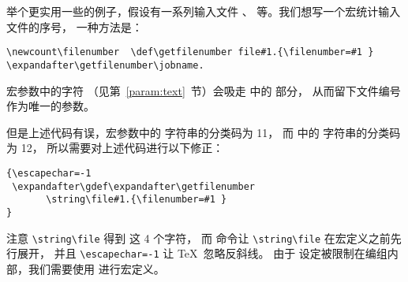 \documentclass{book}
\begin{document}
举个更实用一些的例子，假设有一系列输入文件 、
\label{ex:jobnumber}等。我们想写一个宏统计输入文件的序号，
一种方法是：
\begin{verbatim}
\newcount\filenumber  \def\getfilenumber file#1.{\filenumber=#1 }
\expandafter\getfilenumber\jobname.
\end{verbatim}
宏参数中的字符 （见第~\ref{param:text}~节）会吸走
 中的  部分，
从而留下文件编号作为唯一的参数。

但是上述代码有误，宏参数中的  字符串的分类码为 11，
而  中的  字符串的分类码为 12，
所以需要对上述代码进行以下修正：
\begin{verbatim}
{\escapechar=-1
 \expandafter\gdef\expandafter\getfilenumber
       \string\file#1.{\filenumber=#1 }
}
\end{verbatim}
注意 \verb>\string\file> 得到  这 4 个字符，
而  命令让 \verb>\string\file> 在宏定义之前先行展开，
并且 \verb>\escapechar=-1> 让 \TeX\ 忽略反斜线。
由于  设定被限制在编组内部，我们需要使用  进行宏定义。
\end{document}
